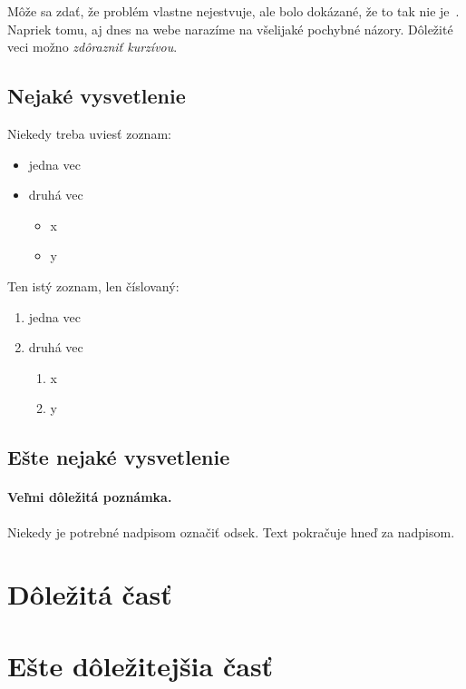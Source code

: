 \documentclass[10pt,twoside,slovak,a4paperr]{coursepaper}
\begin{document}
Môže sa zdať, že problém vlastne nejestvuje\cite{Coplien:MPD}, ale bolo dokázané, že to tak nie je~\cite{Czarnecki:Staged, Czarnecki:Progress}. Napriek tomu, aj dnes na webe narazíme na všelijaké pochybné názory\cite{PLP-Framework}. Dôležité veci možno \emph{zdôrazniť kurzívou}.


\subsection{Nejaké vysvetlenie} \label{ina:nejake}

Niekedy treba uviesť zoznam:

\begin{itemize}
\item jedna vec
\item druhá vec
	\begin{itemize}
	\item x
	\item y
	\end{itemize}
\end{itemize}

Ten istý zoznam, len číslovaný:

\begin{enumerate}
\item jedna vec
\item druhá vec
	\begin{enumerate}
	\item x
	\item y
	\end{enumerate}
\end{enumerate}


\subsection{Ešte nejaké vysvetlenie} \label{ina:este}

\paragraph{Veľmi dôležitá poznámka.}
Niekedy je potrebné nadpisom označiť odsek. Text pokračuje hneď za nadpisom.



\section{Dôležitá časť} \label{dolezita}




\section{Ešte dôležitejšia časť} \label{dolezitejsia}
\end{document}
